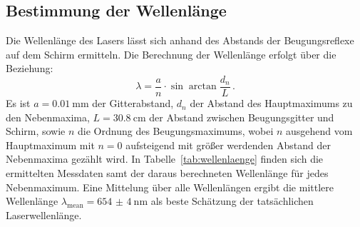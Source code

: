 \subsection{Bestimmung der Wellenlänge}

Die Wellenlänge des Lasers lässt sich anhand des Abstands der Beugungsreflexe auf dem Schirm ermitteln.
Die Berechnung der Wellenlänge erfolgt über die Beziehung:
\begin{equation}
  \lambda=\frac{a}{n}\cdot\sin{\arctan{\frac{d_n}{L}}}\,\text{.}
\end{equation}
Es ist $a=\SI{0.01}{\milli\meter}$ der Gitterabstand, $d_n$ der Abstand des Hauptmaximums zu den Nebenmaxima, $L=\SI{30.8}{\centi\meter}$ der Abstand zwischen Beugungsgitter und Schirm, sowie $n$ die Ordnung des Beugungsmaximums, wobei $n$ ausgehend vom Hauptmaximum mit $n=0$ aufsteigend mit größer werdenden Abstand der Nebenmaxima gezählt wird.
In Tabelle~\ref{tab:wellenlaenge} finden sich die ermittelten Messdaten samt der daraus berechneten Wellenlänge für jedes Nebenmaximum.
Eine Mittelung über alle Wellenlängen ergibt die mittlere Wellenlänge
$\lambda_{\mathrm{mean}}=\SI{654(4)}{\nano\meter}$
als beste Schätzung der tatsächlichen Laserwellenlänge.
